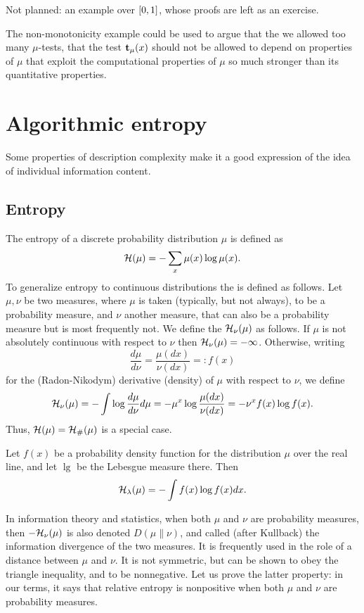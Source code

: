 \begin{formalization}
Not planned: an example over $[0,1]$, whose proofs are left as an exercise.
\end{formalization}

The non-monotonicity example could be used to argue that the 
we allowed too many \( \mu \)-tests, that the test \( \mathbf{t}_{\mu}(x) \)
should not be allowed to depend on properties of \( \mu \) that exploit the
computational properties of \( \mu \) so much stronger than its quantitative
properties.

\section{Algorithmic entropy}

Some properties of description complexity make it a good
expression of the idea of individual information content.

\subsection{Entropy}
The entropy of a discrete probability distribution $\mu$ is defined as
 \[
   \mathcal{H}(\mu) = - \sum_{x} \mu(x) \log \mu(x).
 \]
To generalize entropy to continuous distributions the
 is defined as follows.
Let $\mu,\nu$ be two measures, where $\mu$ is taken (typically, but not
always), to be a probability measure, and $\nu$ another measure, that can
also be a probability measure but is most frequently not.
We define the  $\mathcal{H}_{\nu}(\mu)$ as follows.
If $\mu$ is not absolutely continuous with respect to $\nu$ then 
$\mathcal{H}_{\nu}(\mu) = -\infty$.
Otherwise, writing 
 \[
  \frac{d\mu}{d\nu} = \frac{\mu(dx)}{\nu(dx)} =: f(x)
 \] 
for the (Radon-Nikodym) derivative 
(density) of $\mu$ with respect to $\nu$, we define
 \[
   \mathcal{H}_{\nu}(\mu) = - \int \log\frac{d\mu}{d\nu} d\mu 
     = - \mu^{x} \log\frac{\mu(dx)}{\nu(dx)} = -\nu^{x} f(x) \log f(x).
 \]
Thus, $\mathcal{H}(\mu) = \mathcal{H}_{\#}(\mu)$ is a special case.

 \begin{example}
  \label{ex:g4.5.1}
 Let $f(x)$ be a probability density function for the distribution
$\mu$ over the real line, and let $\lg$ be the Lebesgue measure there.
Then
 \[
   \mathcal{H}_{\lambda}(\mu) = -\int f(x) \log f(x) d x.
 \]
 \end{example}

In information theory and statistics, when both $\mu$ and $\nu$ are
probability measures, then $-\mathcal{H}_{\nu}(\mu)$ is also denoted
$D(\mu \parallel \nu)$, and called (after Kullback) the
information divergence of the two measures.
It is frequently used in the role of a distance between $\mu$ and $\nu$.
It is not symmetric, but can be shown to obey the triangle inequality, and
to be nonnegative.
Let us prove the latter property: in our terms, it says that relative
entropy is nonpositive when both $\mu$ and $\nu$ are probability measures.

